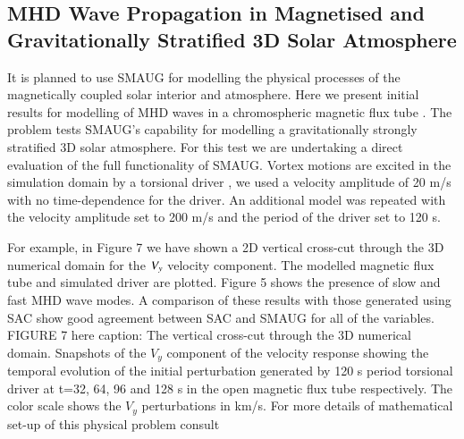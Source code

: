 \documentclass[final,1p]{elsarticle}
\begin{document}
 

\subsection{MHD Wave Propagation in Magnetised and Gravitationally Stratified 3D Solar Atmosphere}

It is planned to use SMAUG for modelling the physical processes of the magnetically coupled solar interior and atmosphere. Here we present initial results for modelling of MHD waves in a chromospheric magnetic flux tube \cite{Fedun2011, Fedun2011c, Fedun2011b}. The problem tests SMAUG's capability for modelling a gravitationally strongly stratified 3D solar atmosphere. For this test we are undertaking a direct evaluation of the full functionality of SMAUG. Vortex motions are excited in the simulation domain by a torsional driver  \cite{Fedun2011, Fedun2011c, Fedun2011b}, we used a velocity amplitude of 20 m/s with no time-dependence for the driver. An additional model was repeated with the velocity amplitude set to 200 m/s and the period of the driver set to 120 s.  

For example, in Figure 7 we have shown a 2D vertical cross-cut through the 3D numerical domain for the $\it V_{y}$ velocity component. The modelled magnetic flux tube and simulated driver are plotted. Figure 5 shows the presence of slow and fast MHD wave modes. A comparison of these results  with those generated using SAC show good agreement between SAC and SMAUG for all of the variables.\\



FIGURE 7 here caption: The vertical cross-cut through the 3D numerical domain. Snapshots of the $V_{y}$ component of the velocity  response showing the temporal evolution of the initial  perturbation  generated by 120 s period torsional driver  at t=32, 64, 96 and 128 s  in the open magnetic flux tube respectively. The color scale shows the $V_{y}$ perturbations in km/s. For more details of mathematical set-up of this physical problem consult  \cite{Fedun2011}\\

\end{document}
